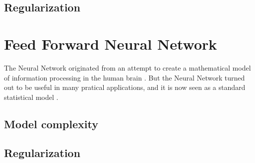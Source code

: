 \subsection{Regularization}


\section{Feed Forward Neural Network}\label{sec:feed-forward-neural-network}
The Neural Network originated from an attempt to create a mathematical model of information processing in the human brain \citep[p.226]{bishop}. But the Neural Network turned out to be useful in many pratical applications, and it is now seen as a standard statistical model \citep[p.392]{hastie09}.
\subsection{Model complexity}
\subsection{Regularization}




